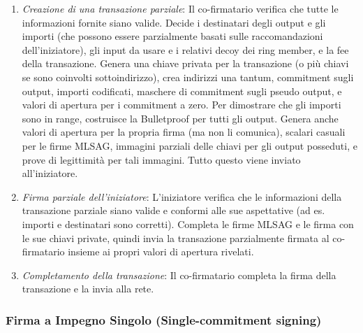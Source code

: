 \begin{enumerate}
\begin{enumerate}
        \item {\em Creazione di una transazione parziale}: Il co-firmatario verifica che tutte le informazioni fornite siano valide. Decide i destinatari degli output e gli importi (che possono essere parzialmente basati sulle raccomandazioni dell'iniziatore), gli input da usare e i relativi decoy dei ring member, e la fee della transazione. Genera una chiave privata per la transazione (o più chiavi se sono coinvolti sottoindirizzo), crea indirizzi una tantum, commitment sugli output, importi codificati, maschere di commitment sugli pseudo output, e valori di apertura per i commitment a zero. Per dimostrare che gli importi sono in range, costruisce la Bulletproof per tutti gli output. Genera anche valori di apertura per la propria firma (ma non li comunica), scalari casuali per le firme MLSAG, immagini parziali delle chiavi per gli output posseduti, e prove di legittimità per tali immagini. Tutto questo viene inviato all'iniziatore.
        \item {\em Firma parziale dell'iniziatore}: L'iniziatore verifica che le informazioni della transazione parziale siano valide e conformi alle sue aspettative (ad es. importi e destinatari sono corretti). Completa le firme MLSAG e le firma con le sue chiavi private, quindi invia la transazione parzialmente firmata al co-firmatario insieme ai propri valori di apertura rivelati.
        \item {\em Completamento della transazione}: Il co-firmatario completa la firma della transazione e la invia alla rete.
    \end{enumerate}{}
\end{enumerate}{}

\subsubsection*{Firma a Impegno Singolo (Single-commitment signing)}

